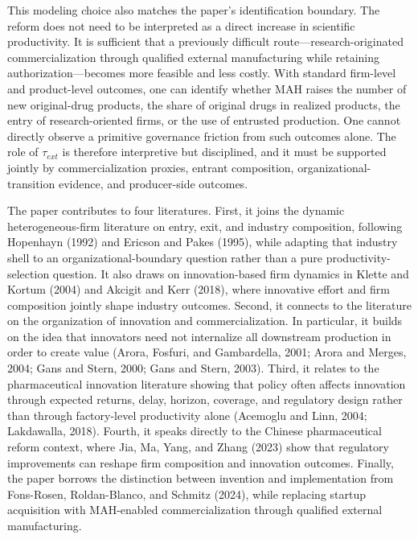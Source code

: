 This modeling choice also matches the paper's identification boundary. The reform does not need to be interpreted as a direct increase in scientific productivity. It is sufficient that a previously difficult route---research-originated commercialization through qualified external manufacturing while retaining authorization---becomes more feasible and less costly. With standard firm-level and product-level outcomes, one can identify whether MAH raises the number of new original-drug products, the share of original drugs in realized products, the entry of research-oriented firms, or the use of entrusted production. One cannot directly observe a primitive governance friction from such outcomes alone. The role of $\tau_{ext}$ is therefore interpretive but disciplined, and it must be supported jointly by commercialization proxies, entrant composition, organizational-transition evidence, and producer-side outcomes.

The paper contributes to four literatures. First, it joins the dynamic heterogeneous-firm literature on entry, exit, and industry composition, following {\color{red}Hopenhayn (1992)} and {\color{red}Ericson and Pakes (1995)}, while adapting that industry shell to an organizational-boundary question rather than a pure productivity-selection question. It also draws on innovation-based firm dynamics in {\color{red}Klette and Kortum (2004)} and {\color{red}Akcigit and Kerr (2018)}, where innovative effort and firm composition jointly shape industry outcomes. Second, it connects to the literature on the organization of innovation and commercialization. In particular, it builds on the idea that innovators need not internalize all downstream production in order to create value {\color{red}(Arora, Fosfuri, and Gambardella, 2001; Arora and Merges, 2004; Gans and Stern, 2000; Gans and Stern, 2003)}. Third, it relates to the pharmaceutical innovation literature showing that policy often affects innovation through expected returns, delay, horizon, coverage, and regulatory design rather than through factory-level productivity alone {\color{red}(Acemoglu and Linn, 2004; Lakdawalla, 2018)}. Fourth, it speaks directly to the Chinese pharmaceutical reform context, where {\color{red}Jia, Ma, Yang, and Zhang (2023)} show that regulatory improvements can reshape firm composition and innovation outcomes. Finally, the paper borrows the distinction between invention and implementation from {\color{red}Fons-Rosen, Roldan-Blanco, and Schmitz (2024)}, while replacing startup acquisition with MAH-enabled commercialization through qualified external manufacturing.

